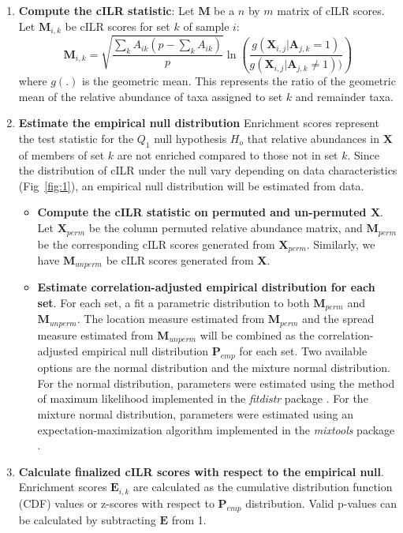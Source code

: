 \documentclass[10pt,letterpaper]{article}
\begin{document}
\begin{enumerate}
    \item \textbf{Compute the cILR statistic}: Let $\mathbf{M}$ be a $n$ by $m$ matrix of cILR scores. Let $\mathbf{M}_{i,k}$ be cILR scores for set $k$ of sample $i$:   
    \begin{equation}\label{main_eq}
        \mathbf{M}_{i,k} = \sqrt{\frac{\sum_k A_{ik}(p - \sum_k A_{ik})}{p}} \ln \left( \frac{g(\mathbf{X}_{i,j}|\mathbf{A}_{j,k} = 1)}{g(\mathbf{X}_{i,j}|\mathbf{A}_{j,k} \neq 1))} \right)
    \end{equation}
    where $g(.)$ is the geometric mean. This represents the ratio of the geometric mean of the relative abundance of taxa assigned to set $k$ and remainder taxa. 
    \item \textbf{Estimate the empirical null distribution} Enrichment scores represent the test statistic for the $Q_1$ null hypothesis $H_o$ that relative abundances in $\mathbf{X}$ of members of set $k$ are not enriched compared to those not in set $k$. Since the distribution of cILR under the null vary depending on data characteristics (Fig~\ref{fig:1}), an empirical null distribution will be estimated from data.
    \begin{itemize}
        \item \textbf{Compute the cILR statistic on permuted and un-permuted $\mathbf{X}$}.  Let $\mathbf{X}_{perm}$ be the column permuted relative abundance matrix, and $\mathbf{M}_{perm}$ be the corresponding cILR scores generated from $\mathbf{X}_{perm}$. Similarly, we have $\mathbf{M}_{unperm}$ be cILR scores generated from $\mathbf{X}$.
        \item \textbf{Estimate correlation-adjusted empirical distribution for each set}. For each set, a fit a parametric distribution to both $\mathbf{M}_{perm}$ and $\mathbf{M}_{unperm}$. The location measure estimated from $\mathbf{M}_{perm}$ and the spread measure estimated from $\mathbf{M}_{unperm}$ will be combined as the correlation-adjusted empirical null distribution $\mathbf{P}_{emp}$ for each set. Two available options are the normal distribution and the mixture normal distribution. For the normal distribution, parameters were estimated using the method of maximum likelihood implemented in the \emph{fitdistr} package \cite{delignette-muller2015}. For the mixture normal distribution, parameters were estimated using an expectation-maximization algorithm implemented in the \emph{mixtools} package \cite{benaglia2009}. 
    \end{itemize}
    \item \textbf{Calculate finalized cILR scores with respect to the empirical null}. Enrichment scores $\mathbf{E}_{i,k}$ are calculated as the cumulative distribution function (CDF) values or z-scores with respect to $\mathbf{P}_{emp}$ distribution. Valid p-values can be calculated by subtracting $\mathbf{E}$ from 1. 
\end{enumerate}
\end{document}
